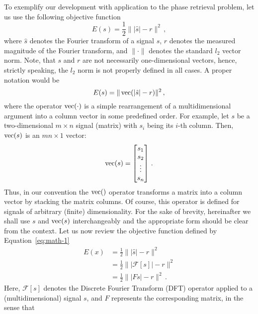 To exemplify our development with application to the phase retrieval
problem, let us use the following objective function
\begin{equation}
  \label{eq:math-1}
  E(s) = \frac{1}{2}\| |\hat{s}| - r\|^{2}\,,
\end{equation}
where $\hat{s}$ denotes the Fourier transform of a signal $s$, $r$
denotes the measured  magnitude of the Fourier transform, and $\|\cdot\|$
denotes the standard $l_{2}$ vector norm. Note, that $s$ and $r$ are not
necessarily one-dimensional vectors, hence, strictly speaking, the
$l_{2}$ norm is not properly defined in all cases. A proper notation would
be
\begin{equation}
  \label{eq:math-2}
  E(s) = \|\operatorname*{\mathrm{vec}}(|\hat{s}| - r)\|^{2}\,, 
\end{equation}
where the operator $\operatorname*{\mathrm{vec}}(\cdot)$ is a simple
rearrangement of a multidimensional argument into a column vector in
some predefined order. For example, let $s$ be a two-dimensional
$m\times n$ signal (matrix) with  $s_{i}$ being its $i$-th column.
Then, $\operatorname*{\mathrm{vec}}(s)$ is an $mn\times 1$ vector:
\begin{equation}
  \label{eq:math-3}
  \operatorname*{\mathrm{vec}}(s) =
  \begin{bmatrix}
    s_{1} \\
    s_{2} \\
    \vdots\\
    s_{n}
  \end{bmatrix} \,.
\end{equation}
Thus, in our convention the $\operatorname*{\mathrm{vec}}()$ operator transforms a matrix into a column
vector by stacking the matrix columns. Of course,
this operator is defined for signals of arbitrary (finite) dimensionality.
For the sake of brevity, hereinafter we shall use $s$ and $\operatorname*{\mathrm{vec}}(s)$
interchangeably and the appropriate form should be clear from the context.
Let us now review the objective function defined by
Equation~\eqref{eq:math-1}
\begin{equation}
  \label{eq:math-4}
  \begin{split}
    E(x)
    & = \frac{1}{2} \| |\hat{s}| - r \|^{2}\\
    & = \frac{1}{2} \| |\mathcal{F}[s]| - r \|^{2}\\
    & = \frac{1}{2} \| |Fs| - r \|^{2} \,.
  \end{split}
\end{equation}
Here, $\mathcal{F}[s]$ denotes the Discrete Fourier Transform (DFT)
operator applied to a (multidimensional) signal $s$, and $F$
represents the corresponding matrix, in the sense that
